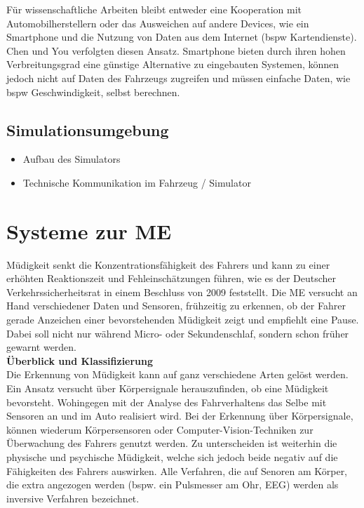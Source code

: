 {Für wissenschaftliche Arbeiten bleibt entweder eine Kooperation mit Automobilherstellern oder das Ausweichen auf andere Devices, wie ein Smartphone und die Nutzung von Daten aus dem Internet (\acl{bspw} Kartendienste). Chen \cite{Chen:2015:ISV:2742647.2742659} und You \cite{You:2013:CAA:2462456.2465428} verfolgten diesen Ansatz. Smartphone bieten durch ihren hohen Verbreitungsgrad eine günstige Alternative zu eingebauten Systemen, können jedoch nicht auf Daten des Fahrzeugs zugreifen und müssen einfache Daten, wie \acl{bspw} Geschwindigkeit, selbst berechnen.

\subsection{Simulationsumgebung}
\label{sec:sim}
\begin{itemize}
  \item Aufbau des Simulators
  \item Technische Kommunikation im Fahrzeug / Simulator \cite{serial}
\end{itemize}



\section{Systeme zur \acl{ME}}
\label{chap:me}
Müdigkeit senkt die Konzentrationsfähigkeit des Fahrers und kann zu einer erhöhten Reaktionszeit und Fehleinschätzungen führen, wie es der Deutscher Verkehrssicherheitsrat in einem Beschluss von 2009 \cite{DVR:Online} feststellt.
Die \acl{ME} versucht an Hand verschiedener Daten und Sensoren, frühzeitig zu erkennen, ob der Fahrer gerade Anzeichen einer bevorstehenden Müdigkeit zeigt und empfiehlt eine Pause.
Dabei soll nicht nur während Micro- oder Sekundenschlaf, sondern schon früher gewarnt werden. \\

\textbf{Überblick und Klassifizierung} \\
Die Erkennung von Müdigkeit kann auf ganz verschiedene Arten gelöst werden. Ein Ansatz versucht über Körpersignale herauszufinden, ob eine Müdigkeit bevorsteht. Wohingegen mit der Analyse des Fahrverhaltens das Selbe mit Sensoren an und im Auto realisiert wird.
Bei der Erkennung über Körpersignale, können wiederum Körpersensoren oder  Computer-Vision-Techniken zur Überwachung des Fahrers genutzt werden. Zu unterscheiden ist weiterhin die physische und psychische Müdigkeit, welche sich jedoch beide negativ auf die Fähigkeiten des Fahrers auswirken. Alle Verfahren, die auf Senoren am Körper, die extra angezogen werden (bspw. ein Pulsmesser am Ohr, EEG) werden als inversive Verfahren bezeichnet.

}
